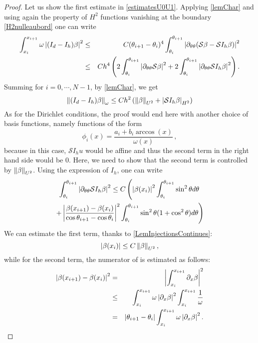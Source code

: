 \documentclass[a4paper]{article}
\begin{document}
\begin{proof}
	Let us show the first estimate in \eqref{estimatesU0U1}. Applying \autoref{lemChar} and using again the property of $H^2$ functions vanishing at the boundary \eqref{H2nulleaubord} one can write
	\begin{eqnarray*}
		\int_{x_i}^{x_{i+1}} \omega \left\lvert (I_d - I_h) \beta \right\rvert^2 &\leq& C  (\theta_{i+1} - \theta_i)^4 \int_{\theta_i}^{\theta_{i+1}} \left\lvert \partial_{\theta\theta}(\mathcal{S}\beta- \mathcal{S}I_h \beta) \right\rvert^2 \\
		&\leq& C h^4 \left(2\int_{\theta_i}^{\theta_{i+1}} \left\lvert \partial_{\theta\theta}\mathcal{S}\beta \right\rvert^2 + 2\int_{\theta_i}^{\theta_{i+1}}\left\lvert \partial_{\theta\theta}\mathcal{S}I_h \beta \right\rvert^2\right).
	\end{eqnarray*}
	Summing for $i = 0, \cdots, N-1$, by \autoref{lemChar}, we get
	\begin{equation}
		\left\|(I_d - I_h)\beta\right\|_{\omega} \leq Ch^2\left(\left\|\beta\right\|_{U^2} + \left\lvert \mathcal{S}I_h \beta \right\rvert_{H^2}\right)
		\label{SummingFor}
	\end{equation}
	As for the Dirichlet conditions, the proof would end here with another choice of basis functions, namely functions of the form
	\[\phi_i(x) = \frac{a_i + b_i \arccos(x)}{\omega(x)}\,,\]
	because in this case, $\mathcal{S}I_h u$ would be affine and thus the second term in the right hand side would be $0$. Here, we need to show that the second term is controlled by $\left\|\beta\right\|_{U^2}$. Using the expression of $I_h$, one can write
	\begin{multline}
	\int_{\theta_i}^{\theta_{i+1}} \left\lvert \partial_{\theta\theta}\mathcal{S} I_h\beta \right\rvert^2\leq C\left(\left\lvert  \beta(x_i) \right\rvert^2 \int_{\theta_i}^{\theta_{i+1}} \sin^2\theta d\theta \right.\\
	\left.+ \left\lvert \frac{\beta(x_{i+1}) -  \beta(x_{i})}{\cos\theta_{i+1} - \cos\theta_i} \right\rvert^2 \int_{\theta_i}^{\theta_{i+1}} \sin^2\theta(1 + \cos^2\theta)d\theta\right)
	\label{CalculIntermediaire}
	\end{multline}
	We can estimate the first term, thanks to \autoref{LemInjectionsContinues}:
	\[\left\lvert  \beta(x_i) \right\rvert \leq C \left\|\beta\right\|_{U^2},\]
	while for the second term, the numerator of is estimated as follows: 
	\begin{eqnarray*}
		\abs{\beta(x_{i+1}) - \beta(x_i)}^2 &=& \abs{ \int_{x_i}^{x_{i+1}} \partial_x  \beta}^2 \\
		& \leq & \int_{x_i}^{x_{i+1}} \omega \abs{\partial_x \beta}^2 \int_{x_i}^{x_{i+1}} \frac{1}{\omega} \\
		&  = & \abs{\theta_{i+1} - \theta_i}\int_{x_i}^{x_{i+1}} \omega \abs{\partial_x \beta}^2.

\end{eqnarray*}
\end{proof}
\end{document}
